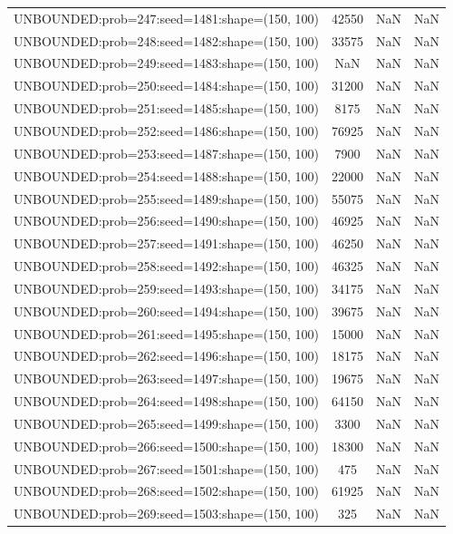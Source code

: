 \begin{longtable}{lccc}
UNBOUNDED:prob=247:seed=1481:shape=(150, 100) & 42550 &   NaN &    NaN \\
UNBOUNDED:prob=248:seed=1482:shape=(150, 100) & 33575 &   NaN &    NaN \\
UNBOUNDED:prob=249:seed=1483:shape=(150, 100) &   NaN &   NaN &    NaN \\
UNBOUNDED:prob=250:seed=1484:shape=(150, 100) & 31200 &   NaN &    NaN \\
UNBOUNDED:prob=251:seed=1485:shape=(150, 100) &  8175 &   NaN &    NaN \\
UNBOUNDED:prob=252:seed=1486:shape=(150, 100) & 76925 &   NaN &    NaN \\
UNBOUNDED:prob=253:seed=1487:shape=(150, 100) &  7900 &   NaN &    NaN \\
UNBOUNDED:prob=254:seed=1488:shape=(150, 100) & 22000 &   NaN &    NaN \\
UNBOUNDED:prob=255:seed=1489:shape=(150, 100) & 55075 &   NaN &    NaN \\
UNBOUNDED:prob=256:seed=1490:shape=(150, 100) & 46925 &   NaN &    NaN \\
UNBOUNDED:prob=257:seed=1491:shape=(150, 100) & 46250 &   NaN &    NaN \\
UNBOUNDED:prob=258:seed=1492:shape=(150, 100) & 46325 &   NaN &    NaN \\
UNBOUNDED:prob=259:seed=1493:shape=(150, 100) & 34175 &   NaN &    NaN \\
UNBOUNDED:prob=260:seed=1494:shape=(150, 100) & 39675 &   NaN &    NaN \\
UNBOUNDED:prob=261:seed=1495:shape=(150, 100) & 15000 &   NaN &    NaN \\
UNBOUNDED:prob=262:seed=1496:shape=(150, 100) & 18175 &   NaN &    NaN \\
UNBOUNDED:prob=263:seed=1497:shape=(150, 100) & 19675 &   NaN &    NaN \\
UNBOUNDED:prob=264:seed=1498:shape=(150, 100) & 64150 &   NaN &    NaN \\
UNBOUNDED:prob=265:seed=1499:shape=(150, 100) &  3300 &   NaN &    NaN \\
UNBOUNDED:prob=266:seed=1500:shape=(150, 100) & 18300 &   NaN &    NaN \\
UNBOUNDED:prob=267:seed=1501:shape=(150, 100) &   475 &   NaN &    NaN \\
UNBOUNDED:prob=268:seed=1502:shape=(150, 100) & 61925 &   NaN &    NaN \\
UNBOUNDED:prob=269:seed=1503:shape=(150, 100) &   325 &   NaN &    NaN \\

\end{longtable}
